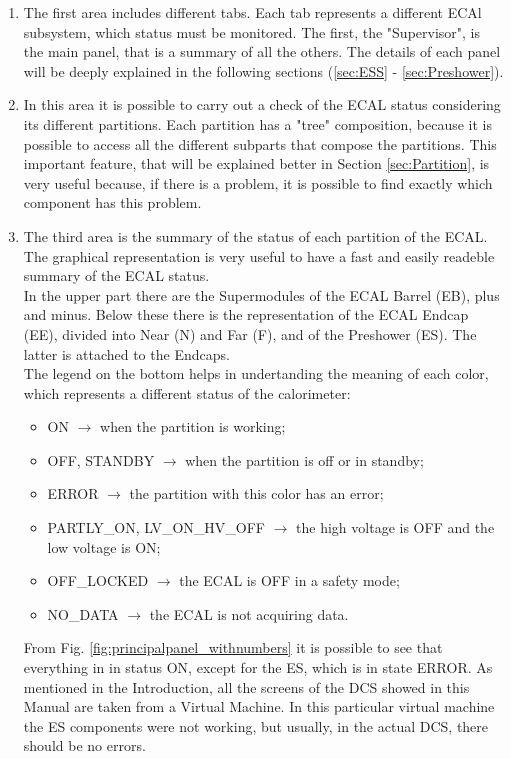 \documentclass[12pt]{article}
\begin{document}
\begin{enumerate}
	\item The first area includes different tabs. Each tab represents a different ECAl subsystem, which status must be monitored. The first, the "Supervisor", is the main panel, that is a summary of all the others. The details of each panel will be deeply explained in the following sections (\ref{sec:ESS} - \ref{sec:Preshower}).
	\item In this area it is possible to carry out a check of the ECAL status considering its different partitions. Each partition has a "tree" composition, because it is possible to access all the different subparts that compose the partitions. This important feature, that will be explained better in Section \ref{sec:Partition}, is very useful because, if there is a problem, it is possible to find exactly which component has this problem. 
	\item The third area is the summary of the status of each partition of the ECAL. The graphical representation is very useful to have a fast and easily readeble summary of the ECAL status. \\
	In the upper part there are the Supermodules of the ECAL Barrel (EB), plus and minus. Below these there is the representation of the ECAL Endcap (EE), divided into Near (N) and Far (F), and of the Preshower (ES). The latter is attached to the Endcaps. \\
	The legend on the bottom helps in undertanding the meaning of each color, which represents a different status of the calorimeter:
	\begin{itemize}
		\item ON $\rightarrow$ when the partition is working;
		\item OFF, STANDBY $\rightarrow$ when the partition is off or in standby;
		\item ERROR $\rightarrow$ the partition with this color has an error;
		\item PARTLY\_ON, LV\_ON\_HV\_OFF $\rightarrow$ the high voltage is OFF and the low voltage is ON;
		\item OFF\_LOCKED $\rightarrow$ the ECAL is OFF in a safety mode;
		\item NO\_DATA $\rightarrow$ the ECAL is not acquiring data.
	\end{itemize}

From Fig. \ref{fig:principalpanel_withnumbers} it is possible to see that everything in in status ON, except for the ES, which is in state ERROR. As mentioned in the Introduction, all the screens of the DCS showed in this Manual are taken from a Virtual Machine. In this particular virtual machine the ES components were not working, but usually, in the actual DCS, there should be no errors. 
\end{enumerate}
\end{document}
